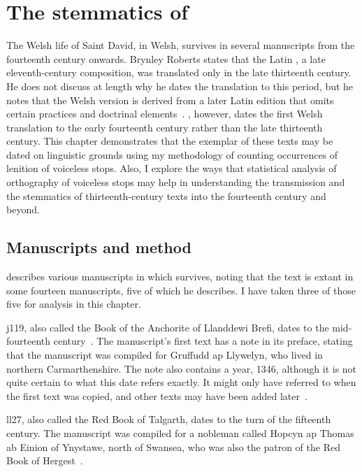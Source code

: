 \chapter{The stemmatics of }
\label{cha:stemm-mwbuch-dewi}
The Welsh life of Saint David,  in Welsh, survives in several manuscripts from the fourteenth century onwards. Brynley Roberts states that the Latin , a late eleventh-century composition, was translated only in the late thirteenth century. He does not discuss at length why he dates the translation to this period, but he notes that the Welsh version is derived from a later Latin edition that omits certain practices and doctrinal elements~\autocite[218--219]{Rob_Ystoriaeu11}. \Textcite[liv]{Eva_Welsh88}, however, dates the first Welsh translation to the early fourteenth century rather than the late thirteenth century.
This chapter demonstrates that the exemplar of these texts may be dated on linguistic grounds using my methodology of counting occurrences of lenition of voiceless stops. Also, I explore the ways that statistical analysis of  orthography of voiceless stops may help in understanding the transmission and the stemmatics of thirteenth-century texts into the fourteenth century and beyond.



\section{Manuscripts and method}
\label{sec:manuscripts-1}

\Textcite[lv--lviii]{Eva_Welsh88} describes  various manuscripts in which  survives, noting that the text is extant in some fourteen manuscripts,  five of which he describes. I have taken three of those five for analysis in this chapter.

\Acrfull{j119}, also called the Book of the Anchorite of Llanddewi Brefi, dates to the mid-fourteenth century~\autocite[59]{huws_medieval_2000}. The manuscript's first text has a note in its preface, stating that the manuscript was compiled for Gruffudd ap Llywelyn, who lived in northern Carmarthenshire. The note also contains a year, 1346, although it is not quite certain to what this date refers exactly. It might only have referred to when the first text was copied, and other texts may have been added later~\autocite[lvi--lvii]{Eva_Welsh88}.

\Acrfull{ll27}, also called the Red Book of Talgarth, dates to the turn of the fifteenth century. The manuscript was compiled for a nobleman called Hopcyn ap Thomas ab Einion of Ynystawe, north of Swansea, who was also the patron of the Red Book of Hergest~\autocite[lvii]{Eva_Welsh88}.

